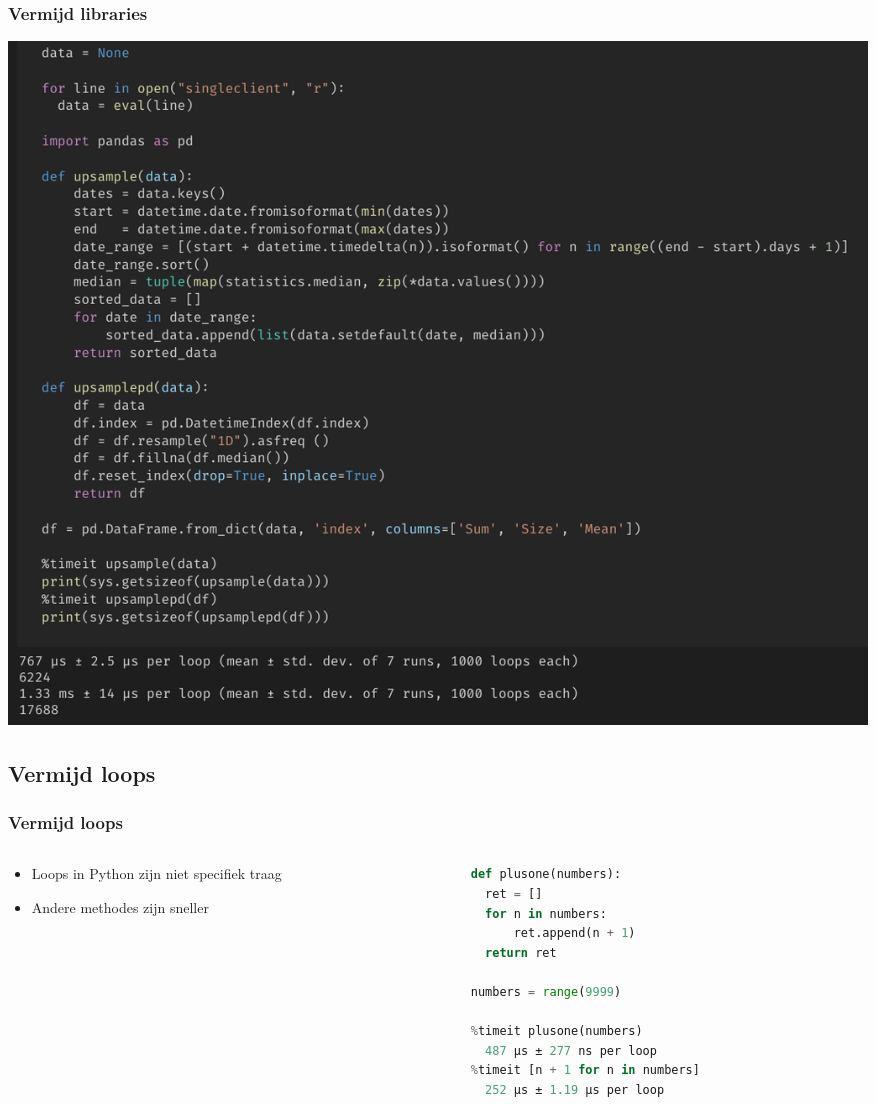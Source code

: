 \documentclass[aspectratio=169]{beamer}
\begin{document}
\begin{frame}[fragile]
  \frametitle{Vermijd libraries}
  \includegraphics[height=0.95\textheight]{img/upsample.png}
\end{frame}

\subsection{Vermijd loops}
\begin{frame}[fragile]
  \frametitle{Vermijd loops}
  \begin{columns}
    \begin{column}{0.3\textwidth}
      \begin{itemize}
        \item Loops in Python zijn niet specifiek traag
        \item Andere methodes zijn sneller
      \end{itemize}
    \end{column}
    \begin{column}{0.7\textwidth}
      \begin{lstlisting}[language=Python, basicstyle=\small]
def plusone(numbers):
  ret = []
  for n in numbers:
      ret.append(n + 1)
  return ret

numbers = range(9999)

%timeit plusone(numbers)
  487 µs ± 277 ns per loop
%timeit [n + 1 for n in numbers]
  252 µs ± 1.19 µs per loop
      \end{lstlisting}
    \end{column}
  \end{columns}
\end{frame}
\end{document}
